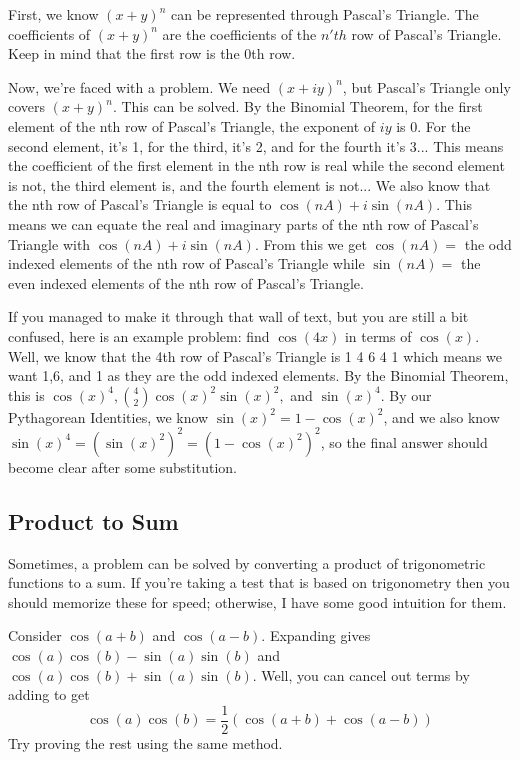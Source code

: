 \documentclass[11pt]{scrartcl}
\begin{document}
\vspace{5mm}
\noindent First, we know $(x+y)^n$ can be represented through Pascal's Triangle. The coefficients of $(x+y)^n$ are the coefficients of the $n'th$ row of Pascal's Triangle. Keep in mind that the first row is the 0th row. 

\vspace{5mm}
\noindent Now, we're faced with a problem. We need $(x+iy)^n$, but Pascal's Triangle only covers $(x+y)^n$. This can be solved. By the Binomial Theorem, for the first element of the nth row of Pascal's Triangle, the exponent of $iy$ is 0. For the second element, it's 1, for the third, it's 2, and for the fourth it's 3... This means the coefficient of the first element in the nth row is real while the second element is not, the third element is, and the fourth element is not... We also know that the nth row of Pascal's Triangle is equal to $\cos(nA)+i\sin(nA)$. This means we can equate the real and imaginary parts of the nth row of Pascal's Triangle with $\cos(nA)+i\sin(nA)$. From this we get $\cos(nA) = $ the odd indexed elements of the nth row of Pascal's Triangle while $\sin(nA) = $ the even indexed elements of the nth row of Pascal's Triangle.

\vspace{5mm}
\noindent If you managed to make it through that wall of text, but you are still a bit confused, here is an example problem: find $\cos(4x)$ in terms of $\cos(x)$. Well, we know that the 4th row of Pascal's Triangle is 1 4 6 4 1 which means we want 1,6, and 1 as they are the odd indexed elements. By the Binomial Theorem, this is $\cos(x)^4, {4\choose2} \cos(x)^2\sin(x)^2,$ and $\sin(x)^4$. By our Pythagorean Identities, we know $\sin(x)^2 = 1-\cos(x)^2$, and we also know $\sin(x)^4=(\sin(x)^2)^2=(1-\cos(x)^2)^2$, so the final answer should become clear after some substitution.

\pagebreak
\subsection{Product to Sum}
\noindent Sometimes, a problem can be solved by converting a product of trigonometric functions to a sum. If you're taking a test that is based on trigonometry then you should memorize these for speed; otherwise, I have some good intuition for them. 

\begin{example}
\vspace{5mm}
\noindent Consider $\cos(a+b)$ and $\cos(a-b)$. Expanding gives $\cos{(a)}\cos{(b)}-\sin{(a)}\sin{(b)}$ and $\cos{(a)}\cos{(b)}+\sin{(a)}\sin{(b)}$. Well, you can cancel out terms by adding to get $$\cos{(a)}\cos{(b)} = \frac{1}{2}(\cos{(a+b)}+\cos{(a-b)})$$ Try proving the rest using the same method.
\end{example}
\end{document}
